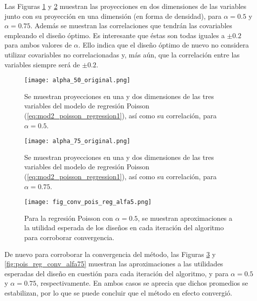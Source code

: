 Las Figuras \ref{fig:pois_reg5} y \ref{fig:pois_reg75} muestran las proyecciones en dos dimensiones de las variables junto con su proyección en una dimensión (en forma de densidad), para $\alpha=0.5$ y $\alpha=0.75$. Además se muestran las correlaciones que tendrán las covariables empleando el diseño óptimo. Es interesante que éstas son todas iguales a $\pm 0.2$ para ambos valores de $\alpha$. Ello indica que el diseño óptimo de nuevo no considera utilizar covariables no correlacionadas y, más aún, que la correlación entre las variables siempre será de $\pm 0.2$. \\







\begin{figure}[h]
	\centering
    \texttt{[image: alpha\_50\_original.png]}
    \caption{Se muestran proyecciones en una y dos dimensiones de las tres variables del modelo de regresión Poisson (\ref{eq:mod2_poisson_regression1}), así como su correlación, para $\alpha=0.5$.}
    \label{fig:pois_reg5}
\end{figure}



\begin{figure}[h]
	\centering
    \texttt{[image: alpha\_75\_original.png]}
    \caption{Se muestran proyecciones en una y dos dimensiones de las tres variables del modelo de regresión Poisson (\ref{eq:mod2_poisson_regression1}), así como su correlación, para $\alpha=0.75$.}
    \label{fig:pois_reg75}
\end{figure}




\begin{figure}[h]
	\centering
    \texttt{[image: fig\_conv\_pois\_reg\_alfa5.png]}
    \caption{Para la regresión Poisson con $\alpha = 0.5$, se muestran aproximaciones a la utilidad esperada de los diseños en cada iteración del algoritmo para corroborar convergencia.}
    \label{fig:pois_reg_conv_alfa5}
\end{figure}


De nuevo para corroborar la convergencia del método, las Figuras \ref{fig:pois_reg_conv_alfa5} y \ref{fig:pois_reg_conv_alfa75} muestran las aproximaciones a las utilidades esperadas del diseño en cuestión para cada iteración del algoritmo, y para $\alpha = 0.5$ y $\alpha = 0.75$, respectivamente. En ambos casos se aprecia que dichos promedios se estabilizan, por lo que se puede concluir que el método en efecto convergió.


